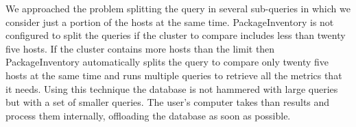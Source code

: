 We approached the problem splitting the query in several sub-queries in
which we consider just a portion of the hosts at the same time.
PackageInventory is not configured to split the queries if the cluster to
compare includes less than twenty five hosts. If the cluster contains more
hosts than the limit then PackageInventory automatically splits the query
to compare only twenty five hosts at the same time and runs multiple
queries to retrieve all the metrics that it needs. Using this technique
the database is not hammered with large queries but with a set of smaller
queries. The user's computer takes than results and process them
internally, offloading the database as soon as possible.
